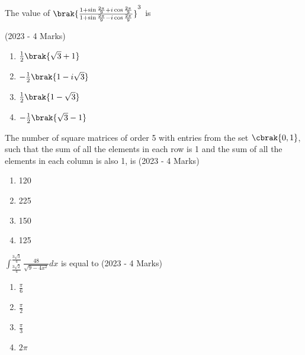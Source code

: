     \item{
	        	The value of $\brak{\frac{1 + \sin{\frac{2\pi}{9}}+ i\cos{\frac{2\pi}{9}}}{1 + \sin{\frac{2\pi}{9}}- i\cos{\frac{2\pi}{9}}}}^3$ is 
            
             \hfill
                {(2023 - 4 Marks)}
            \begin{multicols}{2}
                \begin{enumerate}
                	\item $\frac{1}{2}\brak{\sqrt{3}+1}$
                	\item $-\frac{1}{2}\brak{1-i\sqrt{3}}$
                	\item $\frac{1}{2}\brak{1-\sqrt{3}}$
                	\item $-\frac{1}{2}\brak{\sqrt{3}-1}$
                \end{enumerate}
            \end{multicols}
        
        }
    \item{
    		
    		The number of square matrices of order 5 with entries from the set $\cbrak{0, 1}$, such that the sum of all the elements in each row is 1 and the sum of all the elements in each column is also 1, is 
             \hfill
                {(2023 - 4 Marks)}
			\begin{multicols}{2}
				\begin{enumerate}
					\item 120
					\item 225
					\item 150
					\item 125
				\end{enumerate}
			\end{multicols}
        
        }
    \item{
        	$\int_{\frac{3\sqrt{2}}{4}}^ \frac{3\sqrt{3}}{4} \frac{48}{\sqrt{9-4x^2}}dx$ is equal to \hfill
                {(2023 - 4 Marks)}
				\begin{multicols}{4}
	                \begin{enumerate}
	                	\item $\frac{\pi}{6}$
	                	\item $\frac{\pi}{2}$
	                	\item $\frac{\pi}{3}$
	                	\item $2\pi$
	                \end{enumerate}
				\end{multicols}
        
        }
